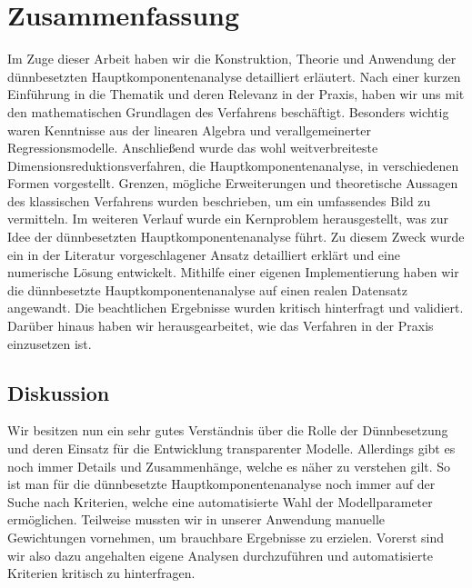 \chapter{Zusammenfassung}

\label{conclusion}

Im Zuge dieser Arbeit haben wir die Konstruktion, Theorie und Anwendung der dünnbesetzten Hauptkomponentenanalyse detailliert erläutert.
Nach einer kurzen Einführung in die Thematik und deren Relevanz in der Praxis, haben wir uns mit den mathematischen Grundlagen des Verfahrens beschäftigt. Besonders wichtig waren Kenntnisse aus der linearen Algebra und verallgemeinerter Regressionsmodelle. Anschließend wurde das wohl weitverbreiteste Dimensionsreduktionsverfahren, die Hauptkomponentenanalyse, in verschiedenen Formen vorgestellt. Grenzen, mögliche Erweiterungen und theoretische Aussagen des klassischen Verfahrens wurden beschrieben, um ein umfassendes Bild zu vermitteln. Im weiteren Verlauf wurde ein Kernproblem herausgestellt, was zur Idee der dünnbesetzten Hauptkomponentenanalyse führt. Zu diesem Zweck wurde ein in der Literatur vorgeschlagener Ansatz detailliert erklärt und eine numerische Lösung entwickelt. Mithilfe einer eigenen Implementierung haben wir die dünnbesetzte Hauptkomponentenanalyse auf einen realen Datensatz angewandt. Die beachtlichen Ergebnisse wurden kritisch hinterfragt und validiert. Darüber hinaus haben wir herausgearbeitet, wie das Verfahren in der Praxis einzusetzen ist.




\section{Diskussion}

Wir besitzen nun ein sehr gutes Verständnis über die Rolle der Dünnbesetzung und deren Einsatz für die Entwicklung transparenter Modelle. Allerdings gibt es noch immer Details und Zusammenhänge, welche es näher zu verstehen gilt. So ist man für die dünnbesetzte Hauptkomponentenanalyse noch immer auf der Suche nach Kriterien, welche eine automatisierte Wahl der Modellparameter ermöglichen. Teilweise mussten wir in unserer Anwendung manuelle Gewichtungen vornehmen, um brauchbare Ergebnisse zu erzielen. Vorerst sind wir also dazu angehalten eigene Analysen durchzuführen und automatisierte Kriterien kritisch zu hinterfragen.

